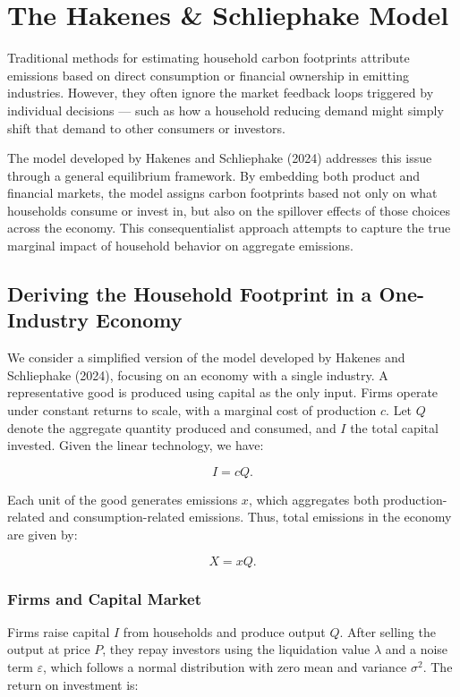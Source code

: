 \documentclass[12pt,a4paper]{article}%
\begin{document}
\section{The Hakenes \& Schliephake Model}

Traditional methods for estimating household carbon footprints attribute emissions based on direct consumption or financial ownership in emitting industries. However, they often ignore the market feedback loops triggered by individual decisions — such as how a household reducing demand might simply shift that demand to other consumers or investors.

The model developed by Hakenes and Schliephake (2024) addresses this issue through a general equilibrium framework. By embedding both product and financial markets, the model assigns carbon footprints based not only on what households consume or invest in, but also on the spillover effects of those choices across the economy. This consequentialist approach attempts to capture the true marginal impact of household behavior on aggregate emissions.

\subsection{Deriving the Household Footprint in a One-Industry Economy}

We consider a simplified version of the model developed by Hakenes and Schliephake (2024), focusing on an economy with a single industry. A representative good is produced using capital as the only input. Firms operate under constant returns to scale, with a marginal cost of production $c$. Let $Q$ denote the aggregate quantity produced and consumed, and $I$ the total capital invested. Given the linear technology, we have:

\[
I = cQ.
\]

Each unit of the good generates emissions $x$, which aggregates both production-related and consumption-related emissions. Thus, total emissions in the economy are given by:

\[
X = xQ.
\]

\subsubsection{Firms and Capital Market}

Firms raise capital $I$ from households and produce output $Q$. After selling the output at price $P$, they repay investors using the liquidation value $\lambda$ and a noise term $\varepsilon$, which follows a normal distribution with zero mean and variance $\sigma^2$. The return on investment is:
\end{document}
